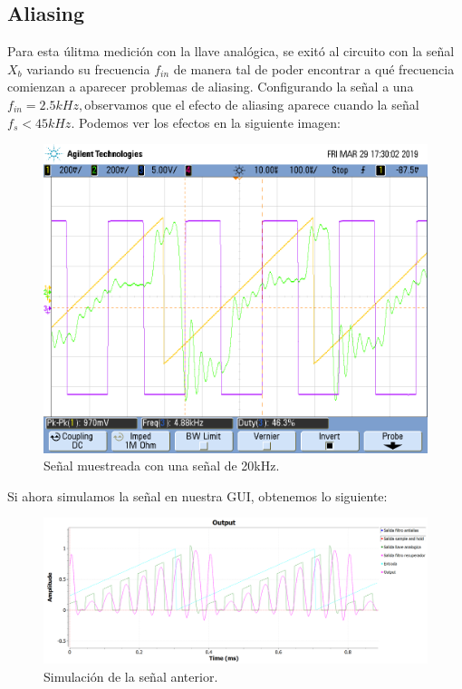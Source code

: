 \documentclass[../../ASSD_TP1_G7.tex]{subfiles}
\begin{document}
\subsection{Aliasing}

Para esta úlitma medición con la llave analógica, se exitó al circuito
con la señal $X_{b}$ variando su frecuencia $f_{in}$ de manera tal
de poder encontrar a qué frecuencia comienzan a aparecer problemas
de aliasing. Configurando la señal a una $f_{in}=2.5kHz,$observamos
que el efecto de aliasing aparece cuando la señal $f_{s}<45kHz$.
Podemos ver los efectos en la siguiente imagen:

\begin{figure}[H]
\begin{centering}
\includegraphics[scale=0.5]{Imagenes/yh_pt6d_cuad2}
\par\end{centering}
\caption{Señal muestreada con una señal de 20kHz.}
\end{figure}

Si ahora simulamos la señal en nuestra GUI, obtenemos lo siguiente:

\begin{figure}[H]
\begin{centering}
\includegraphics[scale=0.5]{Imagenes/simulacion_llave_diente_d}\caption{Simulación de la señal anterior.}
\par\end{centering}
\end{figure}
\end{document}
